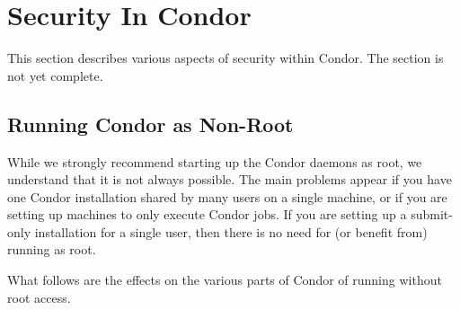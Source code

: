 \section{\label{sec:Security}Security In Condor}

This section describes various aspects of security within Condor.
The section is not yet complete.

\subsection{\label{sec:Non-Root}Running Condor as Non-Root}

While we strongly recommend starting up the Condor daemons as root, we
understand that it is not always possible.
The main problems appear
if you have one Condor installation shared by many users
on a single machine, or if you are setting up machines to only
execute Condor jobs.
If you are setting up a submit-only installation for
a single user, then there is no need for (or benefit from) running as
root.  

What follows are the effects on the various parts of Condor
of running without root access.

